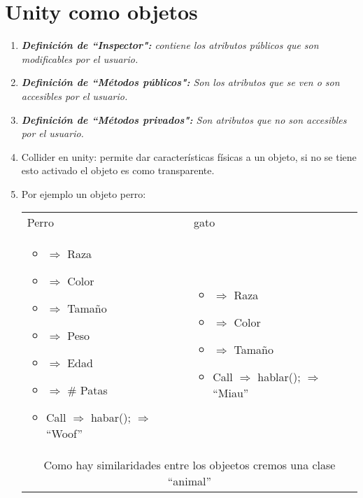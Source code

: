 \section{Unity como objetos}
\begin{enumerate}
    \item \emph{\textbf{Definición de ``Inspector":} contiene los atributos públicos que son modificables por el usuario.}
    \item \emph{\textbf{Definición de ``Métodos públicos":} Son los atributos que se ven o son accesibles por el usuario.}
    \item \emph{\textbf{Definición de ``Métodos privados":} Son atributos que no son accesibles por el usuario.}
    \item Collider en unity: permite dar características físicas a un objeto, si no se tiene esto activado el objeto es como transparente.
    \item Por ejemplo un objeto perro:
        \begin{center}
        \begin{tabular}{ | p{5cm} | p{5cm} | }
         \hline
         Perro & gato \\
         \begin{itemize}
            \item $\Rightarrow$ Raza
            \item $\Rightarrow$ Color 
            \item $\Rightarrow$ Tamaño 
            \item $\Rightarrow$ Peso    
            \item $\Rightarrow$ Edad 
            \item $\Rightarrow$ \# Patas
            \item Call $\Rightarrow$ habar(); $\Rightarrow$ ``Woof''
        \end{itemize} & 
        \begin{itemize}
            \item $\Rightarrow$ Raza
            \item $\Rightarrow$ Color 
            \item $\Rightarrow$ Tamaño  
            \item Call $\Rightarrow$ hablar(); $\Rightarrow$ ``Miau''
        \end{itemize}
         \\ 
        \multicolumn{2}{|c|}{Como hay similaridades entre los objeetos cremos una clase ``animal''} \\ 

\end{tabular}
\end{center}
\end{enumerate}
